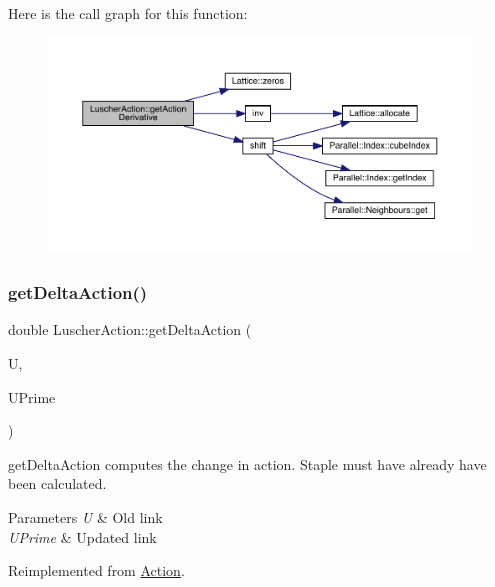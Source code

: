 Here is the call graph for this function\+:\nopagebreak
\begin{figure}[H]
\begin{center}
\leavevmode
\includegraphics[width=350pt]{class_luscher_action_ac11785b2df276816a098a87e6ac514c7_cgraph}
\end{center}
\end{figure}
\mbox{\label{class_luscher_action_a1955f8eea8b0771f6c737c39e3fc11b2}} 
\subsubsection{\texorpdfstring{getDeltaAction()}{getDeltaAction()}}
{\footnotesize\ttfamily double Luscher\+Action\+::get\+Delta\+Action (\begin{DoxyParamCaption}\item[{\mbox{\hyperlink{class_s_u3}{S\+U3}}}]{U,  }\item[{\mbox{\hyperlink{class_s_u3}{S\+U3}}}]{U\+Prime }\end{DoxyParamCaption})\hspace{0.3cm}{\ttfamily [virtual]}}



get\+Delta\+Action computes the change in action. Staple must have already have been calculated. 


\begin{DoxyParams}{Parameters}
{\em U} & Old link \\
\hline
{\em U\+Prime} & Updated link \\
\hline
\end{DoxyParams}


Reimplemented from \mbox{\hyperlink{class_action_a9409aad86cbfe3b6ec25bf5a837eaea5}{Action}}.

